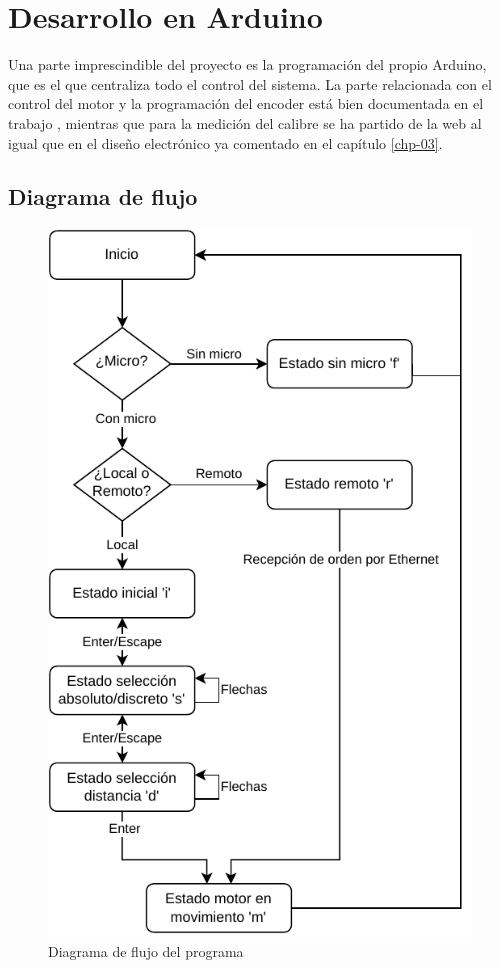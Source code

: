 \chapter{Desarrollo en Arduino}\label{chp-05}

Una parte imprescindible del proyecto es la programación del propio Arduino, que es el que centraliza
todo el control del sistema. La parte relacionada con el control del motor y la programación del encoder 
está bien documentada en el trabajo \cite{tapia}, mientras que para la medición del calibre se ha partido
de la web \cite{caliper} al igual que en el diseño electrónico ya comentado en el capítulo \ref{chp-03}.

\section{Diagrama de flujo}

\begin{figure}[hbtp]
    \centering
    \includegraphics[height=0.5\textheight]{05-arduino/diagramaflujo.pdf}
    \caption{Diagrama de flujo del programa}
    \label{fig:diagramaflujo}
    \end{figure}

